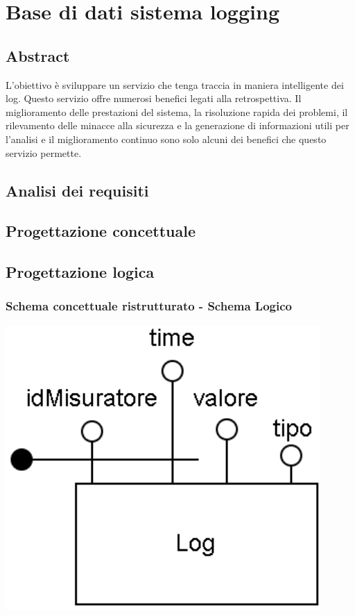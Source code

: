 \section{Base di dati sistema logging}

\subsection{Abstract}

L’obiettivo è sviluppare un servizio che tenga traccia in maniera intelligente dei log. Questo servizio offre numerosi benefici legati alla retrospettiva. Il miglioramento delle prestazioni del sistema, la risoluzione rapida dei problemi, il rilevamento delle minacce alla sicurezza e la generazione di informazioni utili per l'analisi e il miglioramento continuo sono solo alcuni dei benefici che questo servizio permette.

\subsection{Analisi dei requisiti}

\subsection{Progettazione concettuale}

\subsection{Progettazione logica}

\subsubsection{Schema concettuale ristrutturato - Schema Logico}

\begin{center}
    \includegraphics[width=12cm]{contenuti/specifica-basi-dati/img-sbd/logging_logico.png}
\end{center}

